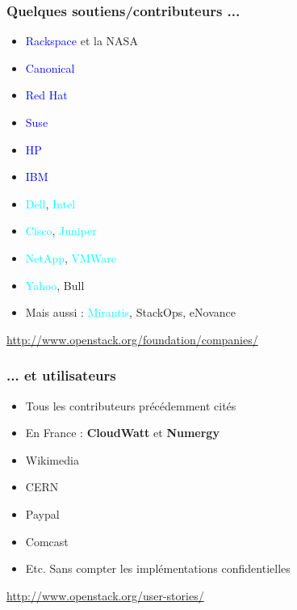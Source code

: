   \begin{frame}
    \frametitle{Quelques soutiens/contributeurs ...}
    \begin{itemize}
      \item \textcolor{blue}{Rackspace} et la NASA\pause
      \item \textcolor{blue}{Canonical}
      \item \textcolor{blue}{Red Hat}
      \item \textcolor{blue}{Suse}\pause
      \item \textcolor{blue}{HP}
      \item \textcolor{blue}{IBM}
      \item \textcolor{cyan}{Dell}, \textcolor{cyan}{Intel}
      \item \textcolor{cyan}{Cisco}, \textcolor{cyan}{Juniper}\pause
      \item \textcolor{cyan}{NetApp}, \textcolor{cyan}{VMWare}\pause
      \item \textcolor{cyan}{Yahoo}, Bull\pause
      \item Mais aussi : \textcolor{cyan}{Mirantis}, StackOps, eNovance\pause
    \end{itemize}
    \url{http://www.openstack.org/foundation/companies/}
  \end{frame}

  \begin{frame}
    \frametitle{... et utilisateurs}
    \begin{itemize}
      \item Tous les contributeurs précédemment cités\pause
      \item En France : \textbf{CloudWatt} et \textbf{Numergy}\pause
      \item Wikimedia
      \item CERN
      \item Paypal
      \item Comcast\pause
      \item Etc. Sans compter les implémentations confidentielles
    \end{itemize}
    \url{http://www.openstack.org/user-stories/}
  \end{frame}

